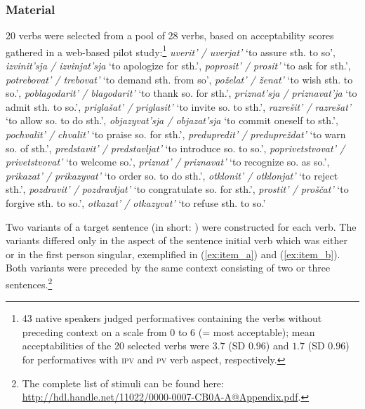 \documentclass[output=paper,colorlinks,citecolor=brown,newtxmath,hidelinks]{langscibook}
\begin{document}
\subsubsection{Material}

20 verbs were selected from a pool of 28  verbs, based on acceptability scores gathered in a web-based pilot study:\footnote{43  native speakers judged performatives containing the verbs without preceding context on a scale from 0 to 6 (= most acceptable); mean acceptabilities of the 20 selected verbs were $3.7$ (SD $0.96$) and $1.7$ (SD $0.96$) for performatives with \textsc{ipv} and \textsc{pv} verb aspect, respectively.} 
\textit{uverit' / uverjat'} ‘to assure sth. to so’, 
\textit{izvinit'sja / izvinjat'sja} ‘to apologize for sth.’, 
\textit{poprosit' / prosit'} ‘to ask for sth.’, 
\textit{potrebovat' / trebovat'} ‘to demand sth. from so’, 
\textit{poželat' / ženat'} ‘to wish sth. to so.’, 
\textit{poblagodarit' / blagodarit'} ‘to thank so. for sth.’, 
\textit{priznat'sja / priznavat'ja} ‘to admit sth. to so.’, 
\textit{priglašat' / priglasit'} ‘to invite so. to sth.’, 
\textit{razrešit' / razrešat'} ‘to allow so. to do sth.’, 
\textit{objazyvat'sja / objazat'sja} ‘to commit oneself to sth.’, 
\textit{pochvalit' / chvalit'} ‘to praise so. for sth.’, 
\textit{predupredit' / predupreždat'} ‘to warn so. of sth.’, 
\textit{predstavit' / predstavljat'} ‘to introduce so. to so.’, \textit{poprivetstvovat' / privetstvovat'} ‘to welcome so.’, 
\textit{priznat' / priznavat'} ‘to recognize so. as so.’, 
\textit{prikazat' / prikazyvat'} ‘to order so. to do sth.’, 
\textit{otklonit' / otklonjat'} ‘to reject sth.’, 
\textit{pozdravit' / pozdravljat'} ‘to congratulate so. for sth.’, 
\textit{prostit' / proščat'} ‘to forgive sth. to so.’, 
\textit{otkazat' / otkazyvat'} ‘to refuse sth. to so.’

Two variants of a  target sentence (in short: ) were constructed for each verb. The variants differed only in the aspect of the sentence initial verb which was either  or   in the first person singular, exemplified in (\ref{ex:item_a}) and (\ref{ex:item_b}). Both  variants were preceded by the same context consisting of two or three sentences.\footnote{The complete list of stimuli can be found here: \url{http://hdl.handle.net/11022/0000-0007-CB0A-A@Appendix.pdf}.\label{fn:app}}
\end{document}
